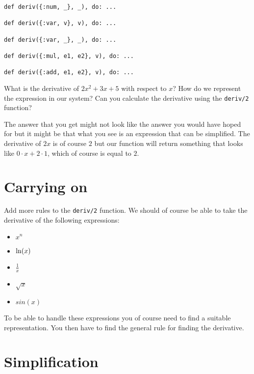 \documentclass[a4paper,11pt]{article}
\begin{document}
\begin{verbatim}
def deriv({:num, _}, _), do: ...

def deriv({:var, v}, v), do: ...

def deriv({:var, _}, _), do: ...

def deriv({:mul, e1, e2}, v), do: ...

def deriv({:add, e1, e2}, v), do: ...
\end{verbatim}

What is the derivative of $2x^{2} + 3x + 5$ with respect to $x$? How do
we represent the expression in our system? Can you calculate the
derivative using the {\tt deriv/2} function?

The answer that you get might not look like the answer you would have
hoped for but it might be that what you see is an expression that can
be simplified. The derivative of $2x$ is of course $2$ but our function
will return something that looks like $0\cdot x + 2\cdot 1$, which of course is equal to $2$.



\section{Carrying on}

Add more rules to the {\tt deriv/2} function. We should of course be
able to take the derivative of the following expressions:

\begin{itemize}
\item $x^n$
\item ${\rm ln}(x)$
\item $\frac{1}{x}$
\item $\sqrt{x}$
\item $sin(x)$
\end{itemize}

To be able to handle these expressions you of course need to find a
suitable representation. You then have to find the general rule for
finding the derivative.



\section{Simplification}
\end{document}

